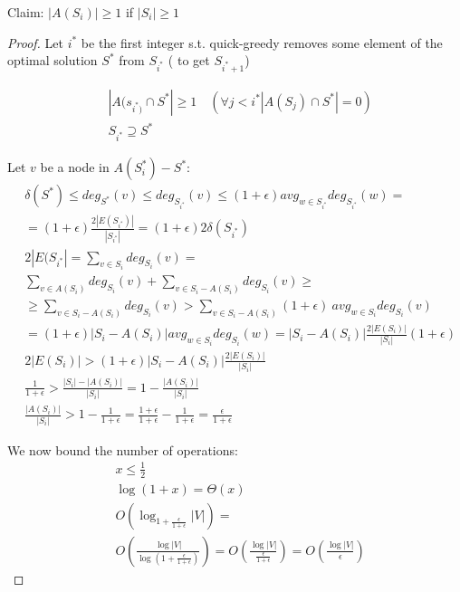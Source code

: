 \documentclass[]{article}
\begin{document}
	Claim: $ |A(S_i)| \geq 1 $ if $ |S_i| \geq 1$
	\begin{proof}

	Let $ i^* $ be the first integer s.t. quick-greedy removes some element of the optimal solution $ S^* $ from $ S_{i^*} $ ( to get $ S_{i^* + 1} $)
	
	\begin{align*}
	&|A(s_{i^*)} \cap S^* | \geq 1 \quad \left(\forall j < i^* |A(S_j) \cap S^*| = 0 \right)\\
	&S_{i^*} \supseteq S^*
 	\end{align*}
 	
 	Let $ v $ be a node in $ A(S_i^*) - S^* $:\\
 	\begin{align*}
 		&\delta(S^*) \leq deg_{S^*}(v) \leq deg_{S_{i^*}}(v) \leq (1+\epsilon) avg_{w \in S_{i^*}} deg_{S_{i^*}}(w)=\\
 		&=(1+\epsilon) \frac{2|E(S_{i^*})|}{|S_{i^*}|} = (1+\epsilon) 2 \delta(S_{i^*})\\
 		& 2|E(S_{i^*}| = \sum_{v \in S_i}^{} deg_{S_i}(v) =\\
 		&\sum_{v \in A(S_i)}^{} deg_{S_i}(v) + \sum_{v \in S_i - A(S_i)}^{} deg_{S_i}(v)\geq\\
 		&\geq \sum_{v \in S_i - A(S_i)}^{} deg_{S_i}(v) > \sum_{v \in S_i - A(S_i)}^{} (1+\epsilon)\ avg_{w \in S_i}deg_{S_i}(v)\\
 		&=(1+\epsilon) |S_i - A(S_i)|  avg_{w \in S_i}deg_{S_i}(w) = |S_i - A(S_i)| \frac{2|E(S_{i})|}{|S_{i}|} (1+\epsilon)\\
 		&2|E(S_i)| > (1+\epsilon) |S_i - A(S_i)| \frac{2|E(S_{i})|}{|S_{i}|}\\
 		& \frac{1}{1+\epsilon} > \frac{|S_i| - |A(S_i)|}{|S_i|} = 1 - \frac{|A(S_i)|}{|S_i|}\\
 		&\frac{|A(S_i)|}{|S_i|} > 1 - \frac{1}{1+\epsilon} = \frac{1+\epsilon}{1+\epsilon} - \frac{1}{1+\epsilon} = \frac{\epsilon}{1+\epsilon} 
 	\end{align*}
 	
 	We now bound the number of operations:
 	\begin{align*}
 		&x\leq \frac{1}{2}\\
 		&\log(1+x) = \Theta(x)\\
 		& O\left(\log_{1+\frac{\epsilon}{1+\epsilon}} |V|\right) = \\
 		& O\left(\frac{\log |V|}{\log \left( 1+\frac{\epsilon}{1+\epsilon} \right)} \right) = O\left(\frac{\log |V|}{\frac{\epsilon}{1+\epsilon}} \right) =  O\left(\frac{\log |V|}{\epsilon} \right)
 	\end{align*}
\end{proof}
\end{document}
